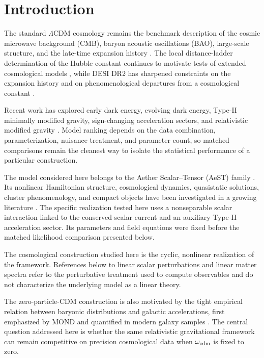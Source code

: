 \documentclass[aps,prd,twocolumn,superscriptaddress,nofootinbib,longbibliography,floatfix]{revtex4-2}
\newcommand{\LCDM}{\Lambda\mathrm{CDM}}
\begin{document}
\section{Introduction}\label{sec:intro}
The standard $\LCDM$ cosmology remains the benchmark description of the cosmic microwave background (CMB), baryon acoustic oscillations (BAO), large-scale structure, and the late-time expansion history \cite{Planck2020VI,DESI2024VI,DESIDR2II2025}. The local distance-ladder determination of the Hubble constant continues to motivate tests of extended cosmological models \cite{Riess2022,Schoneberg2022}, while DESI DR2 has sharpened constraints on the expansion history and on phenomenological departures from a cosmological constant \cite{DESIDR2II2025,DESIDR2Extended2025,Ormondroyd2025,WangMota2025}.

Recent work has explored early dark energy, evolving dark energy, Type-II minimally modified gravity, sign-changing acceleration sectors, and relativistic modified gravity \cite{Poulin2025EDE,Pang2025DDE,DeFeliceMukohyamaPookkillath2021,DeFeliceMaedaMukohyamaPookkillath2022,GanzMartensMukohyamaNamba2023,AkarsuEtAl2024VCDM,AkarsuEtAl2026VCDM,Dixit2026SignSwitch}. Model ranking depends on the data combination, parameterization, nuisance treatment, and parameter count, so matched comparisons remain the cleanest way to isolate the statistical performance of a particular construction.

The model considered here belongs to the Aether Scalar--Tensor (AeST) family \cite{SkordisZlosnik2021,SkordisZlosnik2022}. Its nonlinear Hamiltonian structure, cosmological dynamics, quasistatic solutions, cluster phenomenology, and compact objects have been investigated in a growing literature \cite{BatakiSkordisZlosnik2024,RosaZlosnik2024,VerwayenSkordisBoehm2024,DurakovicSkordis2024,ReyesSakstein2024,ReyesSakstein2025}. The specific realization tested here uses a nonseparable scalar interaction linked to the conserved scalar current and an auxiliary Type-II acceleration sector. Its parameters and field equations were fixed before the matched likelihood comparison presented below.

The cosmological construction studied here is the cyclic, nonlinear realization of the framework. References below to linear scalar perturbations and linear matter spectra refer to the perturbative treatment used to compute observables and do not characterize the underlying model as a linear theory.

The zero-particle-CDM construction is also motivated by the tight empirical relation between baryonic distributions and galactic accelerations, first emphasized by MOND and quantified in modern galaxy samples \cite{Milgrom1983,Bekenstein2004,LelliMcGaughSchombert2016,McGaughLelliSchombert2016}. The central question addressed here is whether the same relativistic gravitational framework can remain competitive on precision cosmological data when $\omega_{\rm cdm}$ is fixed to zero.
\end{document}
